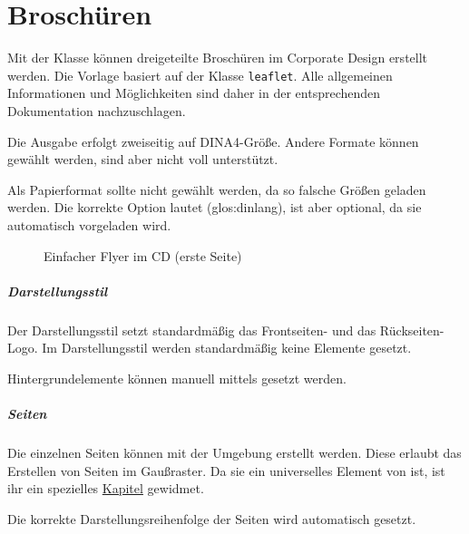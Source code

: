 \chapter{Broschüren}

Mit der Klasse  können dreigeteilte Broschüren
im Corporate Design erstellt werden.
Die Vorlage basiert auf der Klasse \texttt{leaflet}.
Alle allgemeinen Informationen und Möglichkeiten sind daher in der
entsprechenden Dokumentation\cite{cls:leaflet} nachzuschlagen.

Die Ausgabe erfolgt zweiseitig auf DINA4-Größe.
Andere Formate können gewählt werden, sind aber nicht voll unterstützt.

\begin{important}
  Als Papierformat sollte nicht  gewählt werden,
  da so falsche Größen geladen werden. Die korrekte Option lautet
   (\gls{glos:dinlang}),
  ist aber optional, da sie automatisch vorgeladen wird.
\end{important}


\begin{figure}[!ht]
  \caption{Einfacher Flyer im CD (erste Seite)}
\end{figure}

\paragraph{Darstellungsstil}\hfill

\begin{Declaration}
\end{Declaration}

Der Darstellungsstil  setzt standardmäßig das Frontseiten- und das
Rückseiten-Logo.
Im Darstellungsstil  werden standardmäßig keine Elemente gesetzt.

Hintergrundelemente können manuell mittels  gesetzt
werden.

\paragraph{Seiten}\hfill

Die einzelnen Seiten können mit der Umgebung  erstellt
werden. Diese erlaubt das Erstellen von Seiten im Gaußraster.
Da sie ein universelles Element von \tubslatex ist, ist ihr ein spezielles
\href{chap:gausspage}{Kapitel} gewidmet.

Die korrekte Darstellungsreihenfolge der Seiten wird automatisch gesetzt. %
